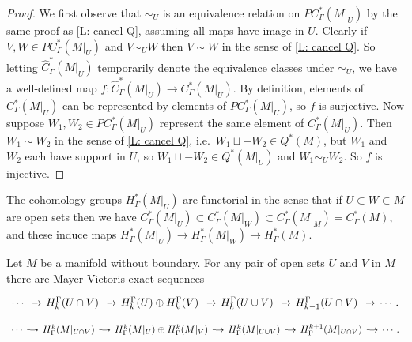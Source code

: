 \begin{proof}
	We first observe that $\sim_U$ is an equivalence relation on $PC_\Gamma^*(M|_U)$ by the same proof as \cref{L: cancel Q}, assuming all maps have image in $U$.
	Clearly if $V,W \in PC_\Gamma^*(M|_U)$ and $V\sim_UW$ then $V\sim W$ in the sense of \cref{L: cancel Q}.
	So letting $\hat C_\Gamma^*(M|_U)$ temporarily denote the
	equivalence classes under $\sim_U$, we have a well-defined map $f \colon \hat C_\Gamma^*(M|_U) \to C_\Gamma^*(M|_U)$.
	By definition, elements of $C_\Gamma^*(M|_U)$ can be represented by elements of $PC_\Gamma^*(M|_U)$, so $f$ is surjective.
	Now suppose $W_1,W_2 \in PC^*_\Gamma(M|_U)$ represent the same element of $C^*_\Gamma(M|_U)$.
	Then $W_1\sim W_2$ in the sense of \cref{L: cancel Q}, i.e.\ $W_1 \sqcup -W_2 \in Q^*(M)$, but $W_1$ and $W_2$ each have support in $U$, so $W_1 \sqcup -W_2 \in Q^*(M|_U)$ and $W_1\sim_U W_2$.
	So $f$ is injective.
\end{proof}

The cohomology groups $H_\Gamma^*(M|_U)$ are functorial in the sense that if $U \subset W \subset M$ are open sets then we have $C_\Gamma^*(M|_U) \subset C_\Gamma^*(M|_W) \subset C_\Gamma^*(M|_M) = C_\Gamma^*(M)$, and these induce maps $H_\Gamma^*(M|_U) \to H_\Gamma^*(M|_W) \to H_\Gamma^*(M)$.

\begin{theorem}\label{T: relative MV}
	Let $M$ be a manifold without boundary.
	For any pair of open sets $U$ and $V$ in $M$ there are Mayer-Vietoris exact sequences
	\begin{equation*}
		\begin{tikzcd}[
			column sep = small,
			arrow style = math font,
			cells = {nodes = {text height = 2ex,text depth = 0.75ex}}
			]
			\cdots \arrow[r] & H^{\Gamma}_{k}(U \cap V) \arrow[r] & H^{\Gamma}_k(U) \oplus H^{\Gamma}_{k}(V)
			\arrow[r] & H_{k}^{\Gamma}(U \cup V) \arrow[r] & H_{k-1}^{\Gamma}(U \cap V) \arrow[r] & \cdots.
		\end{tikzcd}
	\end{equation*}
	\begin{equation*}
		\begin{tikzcd}[
			column sep = small,
			arrow style = math font,
			cells = {nodes = {text height = 2ex,text depth = 0.75ex}}
			]
			\cdots \arrow[r] & H_{\Gamma}^{k}(M|_{U \cap V}) \arrow[r] & H_{\Gamma}^k(M|_U) \oplus H_{\Gamma}^{k}(M|_V)
			\arrow[r] & H^{k}_{\Gamma}(M|_{U \cup V}) \arrow[r] & H^{k+1}_{\Gamma}(M|_{U \cap V}) \arrow[r] & \cdots.
		\end{tikzcd}
	\end{equation*}
\end{theorem}

